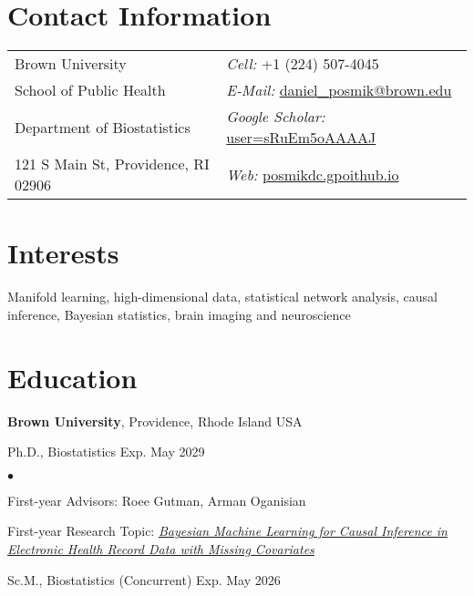 \documentclass[margin,line]{res}
\newenvironment{list1}{
  \begin{list}{\ding{113}}{%
      \setlength{\itemsep}{0in}
      \setlength{\parsep}{0in} \setlength{\parskip}{0in}
      \setlength{\topsep}{0in} \setlength{\partopsep}{0in} 
      \setlength{\leftmargin}{0.17in}}}{\end{list}}
\newenvironment{list2}{
  \begin{list}{$\bullet$}{%
      \setlength{\itemsep}{0in}
      \setlength{\parsep}{0in} \setlength{\parskip}{0in}
      \setlength{\topsep}{0in} \setlength{\partopsep}{0in} 
      \setlength{\leftmargin}{0.2in}}}{\end{list}}
\begin{document}

\begin{resume}
\section{\sc Contact Information}
\vspace{.05in}
\begin{tabular}{@{}p{3in}p{4in}}
Brown University & {\it Cell:} +1 (224) 507-4045 \\ 
School of Public Health & {\it E-Mail:} \href{mailto:daniel_posmik@brown.edu}{daniel\_posmik@brown.edu} \\ 
Department of Biostatistics & {\it Google Scholar:} \href{https://scholar.google.com/citations?user=sRuEm5oAAAAJ}{user=sRuEm5oAAAAJ} \\
121 S Main St, Providence, RI 02906 & {\it Web:} \href{https://posmikdc.github.io}{posmikdc.gpoithub.io} \\       
\end{tabular}

\section{\sc Interests}
Manifold learning, high-dimensional data, statistical network analysis, causal inference, Bayesian statistics, brain imaging and neuroscience

\section{\sc Education}
{\bf Brown University}, Providence, Rhode Island USA\\
\vspace*{-.15in}
\begin{list1}
  \item[] Ph.D., Biostatistics \hfill Exp. May 2029

\begin{list2}
\vspace*{.05in}
\item First-year Advisors: Roee Gutman, Arman Oganisian
\item First-year Research Topic: {\em \href{https://www.pcori.org/research-results/2023/bayesian-machine-learning-causal-inference-electronic-health-record-data-missing-covariates}{Bayesian Machine Learning for Causal Inference in Electronic Health Record Data with Missing Covariates}}
\end{list2}
\vspace*{.03in}
\item[] Sc.M., Biostatistics (Concurrent) \hfill Exp. May 2026
\end{list1}


\end{resume}
\end{document}
